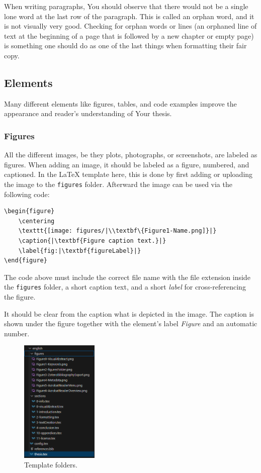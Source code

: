 When writing paragraphs, You should observe that there would not be a single lone word at the last row of the paragraph. This is called an orphan word, and it is not visually very good. Checking for orphan words or lines (an orphaned line of text at the beginning of a page that is followed by a new chapter or empty page) is something one should do as one of the last things when formatting their fair copy.

\subsection{Elements}
Many different elements like figures, tables, and code examples improve the appearance and reader’s understanding of Your thesis.

\subsubsection{Figures}
All the different images, be they plots, photographs, or screenshots, are labeled as figures. When adding an image, it should be labeled as a figure, numbered, and captioned. In the LaTeX template here, this is done by first adding or uploading the image to the \verb|figures| folder. Afterward the image can be used via the following code:

\begin{verbatim}
\begin{figure}
    \centering
    \texttt{[image: figures/|\\textbf\{Figure1-Name.png]}|}
    \caption{|\textbf{Figure caption text.}|}
    \label{fig:|\textbf{figureLabel}|}
\end{figure}
\end{verbatim}

The code above must include the correct file name with the file extension inside the \verb|figures| folder, a short caption text, and a short \emph{label} for cross-referencing the figure.

It should be clear from the caption what is depicted in the image. The caption is shown under the figure together with the element's label \emph{Figure} and an automatic number.

\begin{figure}
    \centering
    \includegraphics[width=0.33\textwidth]{figures/Figure2-figuresFolder.png}
    \caption{Template folders.}
    \label{fig:folders}
\end{figure}

